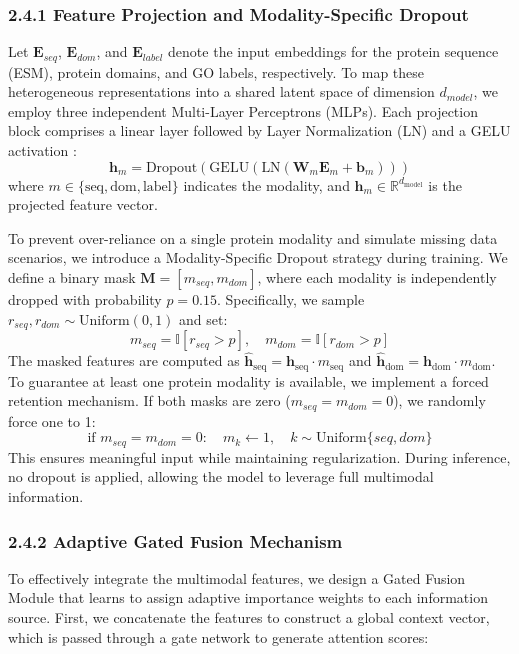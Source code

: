 \documentclass[unnumsec,webpdf,contemporary,large]{oup-authoring-template}%
\theoremstyle{thmstyleone}%
\theoremstyle{thmstyletwo}%
\theoremstyle{thmstylethree}%
\begin{document}
\subsubsection{2.4.1 Feature Projection and Modality-Specific Dropout}

Let $\mathbf{E}_{seq}$, $\mathbf{E}_{dom}$, and $\mathbf{E}_{label}$ denote the input embeddings for the protein sequence (ESM), protein domains, and GO labels, respectively. To map these heterogeneous representations into a shared latent space of dimension $d_{model}$, we employ three independent Multi-Layer Perceptrons (MLPs). Each projection block comprises a linear layer followed by Layer Normalization (LN) \citep{ba2016layer} and a GELU activation \citep{hendrycks2016gaussian}:
\begin{equation}
\mathbf{h}_{m} = \text{Dropout}(\text{GELU}(\text{LN}(\mathbf{W}_m \mathbf{E}_m + \mathbf{b}_m)))
\end{equation}
where $m \in \{\text{seq}, \text{dom}, \text{label}\}$ indicates the modality, and $\mathbf{h}_m \in \mathbb{R}^{d_{\text{model}}}$ is the projected feature vector.

To prevent over-reliance on a single protein modality and simulate missing data scenarios, we introduce a Modality-Specific Dropout strategy during training. We define a binary mask $\mathbf{M} = [m_{seq}, m_{dom}]$, where each modality is independently dropped with probability $p = 0.15$. Specifically, we sample $r_{seq}, r_{dom} \sim \text{Uniform}(0, 1)$ and set:
\begin{equation}
m_{seq} = \mathbb{I}[r_{seq} > p], \quad m_{dom} = \mathbb{I}[r_{dom} > p]
\end{equation}
The masked features are computed as $\hat{\mathbf{h}}_{\text{seq}} = \mathbf{h}_{\text{seq}} \cdot m_{\text{seq}}$ and $\hat{\mathbf{h}}_{\text{dom}} = \mathbf{h}_{\text{dom}} \cdot m_{\text{dom}}$. To guarantee at least one protein modality is available, we implement a forced retention mechanism. If both masks are zero ($m_{seq} = m_{dom} = 0$), we randomly force one to 1:
\begin{equation}
\text{if } m_{seq} = m_{dom} = 0: \quad m_k \leftarrow 1, \quad k \sim \text{Uniform}\{seq, dom\}
\end{equation}
This ensures meaningful input while maintaining regularization. During inference, no dropout is applied, allowing the model to leverage full multimodal information.

\subsubsection{2.4.2 Adaptive Gated Fusion Mechanism}
To effectively integrate the multimodal features, we design a Gated Fusion Module that learns to assign adaptive importance weights to each information source. First, we concatenate the features to construct a global context vector, which is passed through a gate network to generate attention scores:
\end{document}
